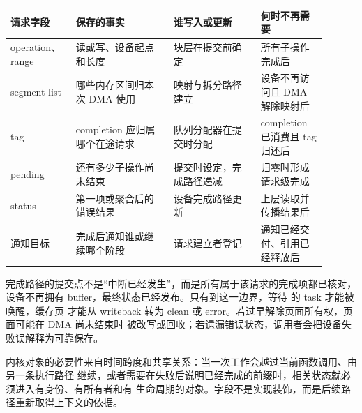 \begin{longtable}{|L{0.17\linewidth}|L{0.29\linewidth}|L{0.25\linewidth}|L{0.19\linewidth}|}
\hline
请求字段 & 保存的事实 & 谁写入或更新 & 何时不再需要 \\ \hline
operation、range & 读或写、设备起点和长度 & 块层在提交前确定 & 所有子操作完成后 \\ \hline
segment list & 哪些内存区间归本次 DMA 使用 & 映射与拆分路径建立 & 设备不再访问且 DMA 解除映射后 \\ \hline
tag & completion 应归属哪个在途请求 & 队列分配器在提交时分配 & completion 已消费且 tag 归还后 \\ \hline
pending & 还有多少子操作尚未结束 & 提交时设定，完成路径递减 & 归零时形成请求级完成 \\ \hline
status & 第一项或聚合后的错误结果 & 设备完成路径更新 & 上层读取并传播结果后 \\ \hline
通知目标 & 完成后通知谁或继续哪个阶段 & 请求建立者登记 & 通知已经交付、引用已经释放后 \\ \hline
\end{longtable}

完成路径的提交点不是“中断已经发生”，而是所有属于该请求的完成项都已核对，设备不再拥有
buffer，最终状态已经发布。只有到这一边界，等待  的 task 才能被唤醒，缓存页
才能从 writeback 转为 clean 或 error。若过早解除页面所有权，页面可能在 DMA 尚未结束时
被改写或回收；若遗漏错误状态，调用者会把设备失败误解释为可靠保存。

\begin{keyidea}
内核对象的必要性来自时间跨度和共享关系：当一次工作会越过当前函数调用、由另一条执行路径
继续，或者需要在失败后说明已经完成的前缀时，相关状态就必须进入有身份、有所有者和有
生命周期的对象。字段不是实现装饰，而是后续路径重新取得上下文的依据。
\end{keyidea}
